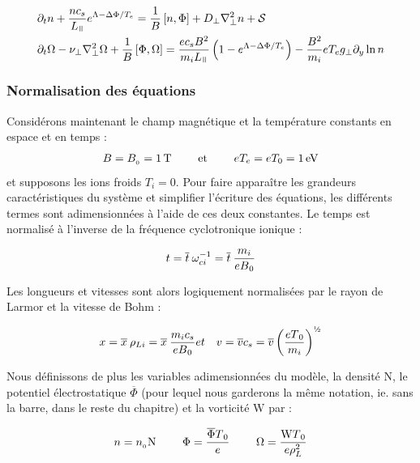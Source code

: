 \begin{refsection}
\begin{align}
\label{2-eqContinuiteMoyenne}
&\partial_t n + \frac{nc_s}{L_\para}e^{\Lambda-\Delta \Phi/T_e} =
\frac{1}{B}\left[n,\Phi\right] + D_\perp\nabla^2_\perp n + \mathcal{S}\\
&\partial_{t}\Omega - \nu_\perp
\nabla_\perp^2\Omega+
\frac{1}{B}\left[\Phi,\Omega\right]=\frac{ec_sB^2}{m_iL_\para}\left(1-e^{\Lambda-\Delta
\Phi/T_e}\right) -\frac{B^2}{m_i}eT_eg_\perp\partial_y\ln n
\label{2-eqCourantMoyenne}
\end{align}
 
\subsubsection{Normalisation des équations}

Considérons maintenant le champ magnétique et la température constants en espace
et en temps :
\begin{equation}
B=B_{{_{0}}}=1\,\text{T~~~~~~~et~~~~~~~}eT_e=eT_0=1\,\text{eV}
\end{equation}
et supposons les
ions froids $T_i=$0.
Pour faire apparaître les grandeurs caractéristiques du système et simplifier
l'écriture des équations, les différents termes sont adimensionnées à
l'aide de ces deux constantes. Le temps est normalisé à l'inverse de la
fréquence cyclotronique ionique :

\begin{equation}
t = \overline{t}\:\omega_{ci}^{{-1}} =
\overline{t}\:\frac{m_i}{eB{_{0}}}
\end{equation}

Les longueurs et vitesses sont alors logiquement normalisées par le rayon de
Larmor et la vitesse de Bohm :

\begin{eqnarray}
x = \overline{x}\:\rho_{Li} =
\overline{x}\:\frac{m_ic_s}{eB\indice{0}} &
et &
v=\overline{v}c_s=\overline{v}\left(\frac{eT\indice{0}}{m_i}\right)^{\text{\textonehalf}}
\end{eqnarray}

Nous définissons de plus les variables adimensionnées du modèle, la densité
$\text{N}$, le potentiel électrostatique $\overline{\Phi}$ (pour lequel nous
garderons la même notation, ie. sans la barre, dans le reste du chapitre) et la
vorticité $\text{W}$ par :

\begin{eqnarray}
n = n_{{_{0}}}\text{N} \text{~~~~~~~} \Phi=\frac{\overline{\Phi}
T{_{0}}}{e}
\text{~~~~~~~} \Omega=\frac{\text{W} T{_{0}}}{e\rho_L^2}
\end{eqnarray}


\end{refsection}
